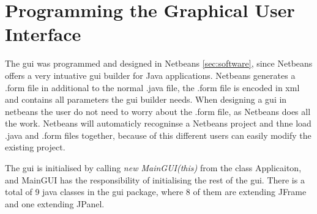 \section{Programming the Graphical User Interface}
The \acrshort{gui} was programmed and designed in Netbeans \ref{sec:software}, since Netbeans offers a very intuative \acrshort{gui} builder for Java applications. Netbeans generates a .form file in additional to the normal .java file, the .form file is encoded in xml and contains all parameters the \acrshort{gui} builder needs. When designing a gui in netbeans the user do not need to worry about the .form file, as Netbeans does all the work. Netbeans will automaticly recogninse a Netbeans project and thne load .java and .form files together, because of this different users can easily modify the existing project.

The \acrshort{gui} is initialised by calling \textit{new MainGUI(this)} from the class Applicaiton, and MainGUI has the responsibility of initialising the rest of the \acrshort{gui}. There is a total of 9 java classes in the gui package, where 8 of them are extending JFrame and one extending JPanel.